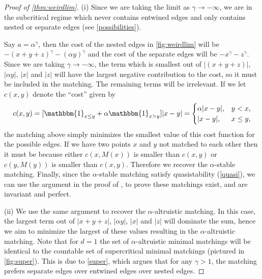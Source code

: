 \documentclass{article}
\begin{document}
\begin{proof}[Proof of \cref{thm:weirdlim}]
  (i) Since we are taking the limit as $\gamma\rightarrow -\infty$, we
  are in the subcritical regime which never contains entwined edges
  and only contains nested or separate edges (see \cref{possibilities}).

  Say $a=\alpha^\gamma$, then the cost of
  the nested edges in \cref{fig:weirdlim} will be
  $-(x+y+z)^\gamma-(\alpha y)^\gamma$ and
  the cost of the separate edges will be $-
  x^\gamma- z^\gamma$. Since we are taking $\gamma\rightarrow -\infty$, the
  term which is smallest out of $|(x+y+z)|$, $|\alpha y|$, $| x|$ and
  $|z|$ will have the largest negative contribution to the
  cost, so it must be included in the matching. The remaining terms
  will be irrelevant.
  If we let $c(x,y) $ denote the ``cost'' given by
  \begin{equation*}
  c(x,y) = [\mathbbm{1}_{x\leq
  y}+\alpha\mathbbm{1}_{x>y}]|x-y| = \begin{cases} \alpha|x-y|, &
  y<x, \\ |x-y|, & x\leq y,\end{cases}
\end{equation*}
the matching above simply minimizes the smallest value of this cost
function for the possible edges.
If we have two points $x$ and $y$ not matched to each other then it
must be because either $c(x,M(x))$ is smaller than $c(x,y)$ or
$c(y,M(y))$ is smaller than $c(x,y)$. Therefore we recover the
$\alpha$-stable matching. Finally, since the $\alpha$-stable matching
satisfy quasistability (\cref{quasi}), we can use the
argument in the proof of \cite[Proposition 26]{minimal}, to prove these matchings
exist, and are invariant and perfect.

(ii)
We use the same argument to recover the $\alpha$-altruistic matching. In this case, the largest term
out of  $|x+y+z|$, $|\alpha y|$, $| x|$ and $| z|$ will
dominate the sum, hence we aim to minimize the largest of these values
resulting in the $\alpha$-altruistic matching.
Note that for $d=1$ the set of $\alpha$-altruistic minimal matchings will
be identical to the countable set of supercritical minimal matchings
(pictured in \cref{fig:super}). This is due to \cref{super}, which argues that for any
$\gamma>1$, the matching prefers separate edges over entwined edges
over nested edges.
\end{proof}
\end{document}
